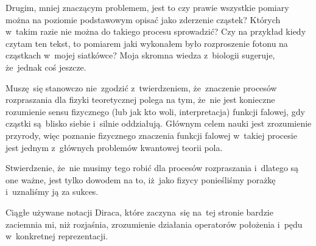 \documentclass[a4paper,11pt]{article}
\numberwithin{equation}{section}
\begin{document}
Drugim, mniej znaczącym problemem, jest to czy prawie wszystkie
pomiary można na poziomie podstawowym opisać jako zderzenie cząstek?
Których w~takim razie nie można do takiego procesu sprowadzić? Czy na
przykład kiedy czytam ten tekst, to pomiarem jaki wykonałem było
rozproszenie fotonu na cząstkach w~mojej siatkówce? Moja skromna
wiedza z~biologii sugeruje, że~jednak coś jeszcze.

\VerSpaceFour





\noindent
{} Muszę~się stanowczo nie~zgodzić z~twierdzeniem, że~znaczenie
procesów rozpraszania dla fizyki teoretycznej polega na tym, że~nie jest
konieczne rozumienie sensu fizycznego (lub jak kto woli, interpretacja)
funkcji falowej, gdy cząstki są~blisko siebie i~silnie oddziałują. Głównym
celem nauki jest zrozumienie przyrody, więc poznanie fizycznego znaczenia
funkcji falowej w~takiej procesie jest jednym z~głównych problemów
kwantowej teorii pola.

Stwierdzenie, że~nie musimy tego robić dla procesów rozpraszania
i~dlatego są one ważne, jest tylko dowodem na to, iż~jako fizycy
ponieśliśmy porażkę i~uznaliśmy ją za sukces.

\VerSpaceFour





\noindent
{}

\VerSpaceFour





\noindent
{} Ciągłe używane notacji Diraca, które zaczyna~się na~tej stronie
bardzie zaciemnia mi, niż rozjaśnia, zrozumienie działania operatorów
położenia i~pędu w~konkretnej reprezentacji.

\VerSpaceFour





\noindent
{}

\VerSpaceFour





\newpage

\end{document}
